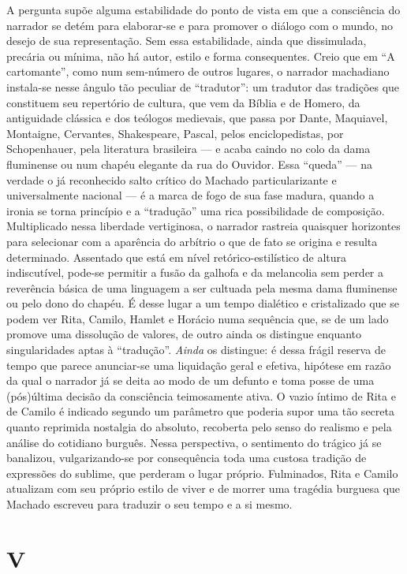 A pergunta supõe alguma estabilidade do ponto de vista em que a
consciência do narrador se detém para elaborar-se e para promover o
diálogo com o mundo, no desejo de sua representação. Sem essa
estabilidade, ainda que dissimulada, precária ou mínima, não há autor,
estilo e forma consequentes. Creio que em ``A cartomante'', como num
sem-número de outros lugares, o narrador machadiano instala-se nesse
ângulo tão peculiar de ``tradutor'': um tradutor das tradições que
constituem seu repertório de cultura, que vem da Bíblia e de Homero, da
antiguidade clássica e dos teólogos medievais, que passa por Dante,
Maquiavel, Montaigne, Cervantes, Shakespeare, Pascal, pelos
enciclopedistas, por Schopenhauer, pela literatura brasileira --- e acaba
caindo no colo da dama fluminense ou num chapéu elegante da rua do
Ouvidor. Essa ``queda'' --- na verdade o já reconhecido salto crítico do
Machado particularizante e universalmente nacional --- é a marca de fogo
de sua fase madura, quando a ironia se torna princípio e a ``tradução''
uma rica possibilidade de composição. Multiplicado nessa liberdade
vertiginosa, o narrador rastreia quaisquer horizontes para selecionar
com a aparência do arbítrio o que de fato se origina e resulta
determinado. Assentado que está em nível retórico-estilístico de altura
indiscutível, pode-se permitir a fusão da galhofa e da melancolia sem
perder a reverência básica de uma linguagem a ser cultuada pela mesma
dama fluminense ou pelo dono do chapéu. É desse lugar a um tempo
dialético e cristalizado que se podem ver Rita, Camilo, Hamlet e Horácio
numa sequência que, se de um lado promove uma dissolução de valores, de
outro ainda os distingue enquanto singularidades aptas à ``tradução''.
\emph{Ainda} os distingue: é dessa frágil reserva de tempo que parece
anunciar-se uma liquidação geral e efetiva, hipótese em razão da qual o
narrador já se deita ao modo de um defunto e toma posse de uma
(pós)última decisão da consciência teimosamente ativa. O vazio íntimo de
Rita e de Camilo é indicado segundo um parâmetro que poderia supor uma
tão secreta quanto reprimida nostalgia do absoluto, recoberta pelo senso
do realismo e pela análise do cotidiano burguês. Nessa perspectiva, o
sentimento do trágico já se banalizou, vulgarizando-se por consequência
toda uma custosa tradição de expressões do sublime, que perderam o lugar
próprio. Fulminados, Rita e Camilo atualizam com seu próprio estilo de
viver e de morrer uma tragédia burguesa que Machado escreveu para
traduzir o seu tempo e a si mesmo.

\section{V}

